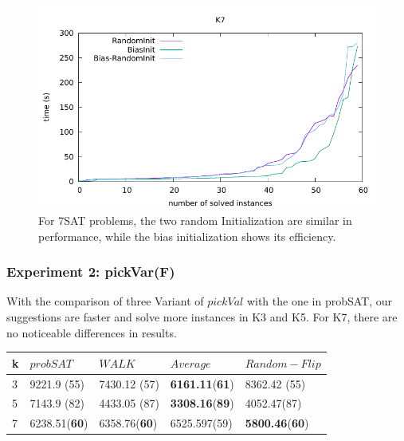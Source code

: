 \documentclass[12pt,a4paper,twoside]{scrartcl}
\numberwithin{equation}{section}
\begin{document}
  \begin{figure}[H]
\begin{center}
  \includegraphics[scale = 1]{DATA/K7/e1.pdf}
  \end{center}
  \caption{For 7SAT problems, the two random Initialization are similar in performance, while the bias initialization shows its efficiency.}
  \label{Experiment 1 k7 cactus plot}
  \end{figure}
\subsubsection{Experiment 2: pickVar(F)} 
\label{sec:Experiment 2} 
With the comparison of three Variant of $pickVal$ with the one in probSAT, our suggestions are faster and solve more instances in K3 and K5.  For K7,  there are no noticeable differences in results.
\begin{table}[h!]
\begin{center}
    \begin{tabular}{|l|l|l|l|p{3cm}|}
\hline 
    k &$probSAT$&$WALK$&$Average$&$Random-Flip$ \\ \hline
	3&9221.9 (55)&7430.12 (57)&\textbf{6161.11}(\textbf{61})&8362.42 (55) \\ \hline
	5&7143.9 (82)&4433.05 (87)&\textbf{3308.16}(\textbf{89})&4052.47(87)\\ \hline

	7& 	6238.51(\textbf{60})& 6358.76(\textbf{60})&6525.597(59)&\textbf{5800.46}(\textbf{60})\\ \hline
	
\end{tabular}
\end{center}
\end{table} 
\end{document}
